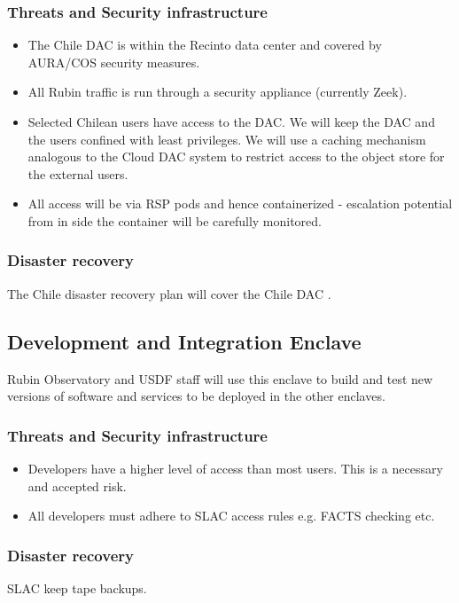 \subsubsection{ Threats and Security infrastructure}

\begin{itemize}
\item The Chile DAC is within the Recinto data center and covered by AURA/COS security measures.\item All Rubin traffic is run through a security appliance (currently Zeek).
\item Selected Chilean users have access to the DAC. We will keep the DAC and the users confined with least privileges. We will use a caching mechanism analogous to the Cloud DAC system to restrict access to the object store for the external users.
\item All access will be via \gls{RSP} pods and hence containerized - escalation potential from in side the container will be carefully monitored.
\end{itemize}
\subsubsection{Disaster recovery}
The Chile disaster recovery plan will cover the Chile \gls{DAC} .

\subsection{Development and Integration  \gls{Enclave}}
Rubin Observatory and \gls{USDF} staff will use this enclave to build and test new versions of software and services to be deployed in the other enclaves.

\subsubsection{Threats and Security infrastructure}

\begin{itemize}
\item Developers have a higher level of access than most users.
This is a necessary and accepted risk.
\item All developers must adhere to  SLAC access rules e.g. FACTS checking etc.
\end{itemize}

\subsubsection{Disaster recovery}
SLAC keep tape backups.

